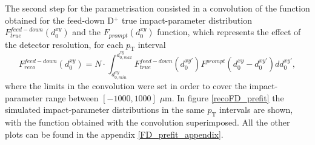 \documentclass[b5paper,10pt,twoside,oldstyle,classica]{toptesi}
\newcommand{\pt}{p_\text{T}}
\begin{document}
The second step for the parametrisation consisted in a convolution of the function obtained for the feed-down D$^+$ true impact-parameter distribution $F_{true}^{feed-down}(d_0^{xy})$ and the $F_{prompt}(d_0^{xy})$ function, which represents the effect of the detector resolution, for each $\pt$ interval 
\begin{equation}
F^{feed-down}_{reco}(d_0^{xy}) = N \cdot \int_{d_{0,min}^{xy}}^{d_{0,max}^{xy}} F^{feed-down}_{true}(d_0^{xy\prime}) F^{prompt}(d_0^{xy}-d_0^{xy\prime})dd_0^{xy\prime},
\end{equation}
where the limits in the convolution were set in order to cover the impact-parameter range between $[-1000,1000]$ $\mu$m. In figure \ref{recoFD_prefit} the simulated impact-parameter distributions in the same $\pt$ intervals are shown, with the function obtained with the convolution superimposed. All the other plots can be found in the appendix \ref{FD_prefit_appendix}. 
\end{document}
